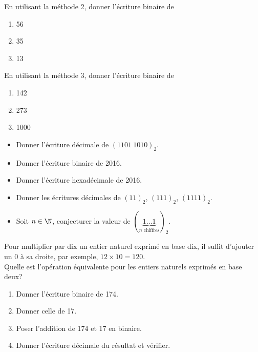 \begin{exercice}[]
    En utilisant la méthode 2, donner l'écriture binaire de
    \begin{enumerate}
        \item 	56
        \item 	35
        \item 	13
    \end{enumerate}
\end{exercice}

\begin{exercice}[]
    En utilisant la méthode 3, donner l'écriture binaire de
    \begin{enumerate}
        \item 	142
        \item 	273
        \item 	1000
    \end{enumerate}
\end{exercice}

\begin{exercice}
    \begin{itemize}
        \item 	Donner l'écriture décimale de $(1101\ 1010)_2$.
        \item 	Donner l'écriture binaire de 2016.
        \item 	Donner l'écriture hexadécimale de 2016.
    \end{itemize}
\end{exercice}

\begin{exercice}
    \begin{itemize}
        \item 	Donner les écritures décimales de $(11)_2$, $(111)_2$, $(1111)_2$.
        \item   Soit $n \in \N$, conjecturer la valeur de $ \left(\underbrace{1\ldots 1}_{n\textrm{ chiffres}}\right)_2$.
    \end{itemize}
\end{exercice}

\begin{exercice}
    Pour multiplier par dix un entier naturel exprimé en base dix, il suffit d'ajouter un 0 à sa
    droite, par exemple, $12\times 10 = 120$.\\
    Quelle est l'opération équivalente pour les entiers naturels exprimés en base deux?
\end{exercice}

\begin{exercice}
    \begin{enumerate}
        \item 	Donner l'écriture binaire de 174.
        \item 	Donner celle de 17.
        \item 	Poser l'addition de 174 et 17 en binaire.
        \item 	Donner l'écriture décimale du résultat et vérifier.
    \end{enumerate}
\end{exercice}

